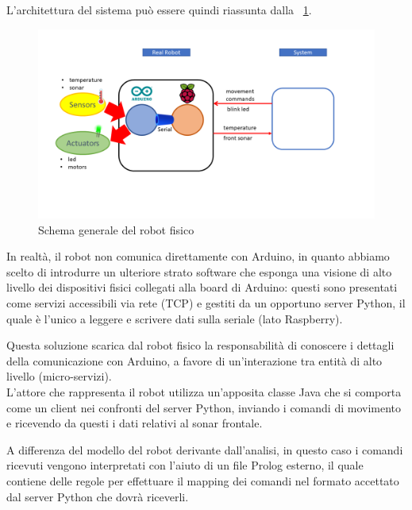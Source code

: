 \documentclass{../llncs}
\newcommand{\labelfig}[1]{\label{fig:#1}}
\newcommand{\xf}[1]{\figurename~\ref{fig:#1}}
\begin{document}
L'architettura del sistema può essere quindi riassunta dalla \xf{raspRobotSchema}.

\begin{figure}[!htb]
\centering
\includegraphics[scale=0.40]{img/arduinoRaspberry.png}
\caption{Schema generale del robot fisico}\labelfig{raspRobotSchema}
\end{figure}

In realtà, il robot non comunica direttamente con Arduino, in quanto abbiamo scelto di introdurre un ulteriore strato software che esponga una visione di alto livello dei dispositivi fisici collegati alla board di Arduino: questi sono presentati come servizi accessibili via rete (TCP) e gestiti da un opportuno server Python, il quale è l'unico a leggere e scrivere dati sulla seriale (lato Raspberry).

Questa soluzione scarica dal robot fisico la responsabilità di conoscere i dettagli della comunicazione con Arduino, a favore di un'interazione tra entità di alto livello (micro-servizi).\\



L'attore che rappresenta il robot utilizza un'apposita classe Java che si comporta come un client nei confronti del server Python, inviando i comandi di movimento e ricevendo da questi i dati relativi al sonar frontale.

A differenza del modello del robot derivante dall'analisi, in questo caso i comandi ricevuti vengono interpretati con l'aiuto di un file Prolog esterno, il quale contiene delle regole per effettuare il mapping dei comandi nel formato accettato dal server Python che dovrà riceverli.\\
\end{document}
